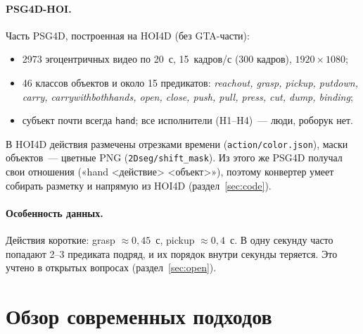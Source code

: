 \documentclass[11pt,a4paper]{article}
\newcommand{\code}[1]{\texttt{#1}}
\begin{document}
\paragraph{PSG4D-HOI.} Часть PSG4D, построенная на HOI4D (без GTA-части):
\begin{itemize}
  \item 2973 эгоцентричных видео по 20~с, 15~кадров/с (300 кадров), $1920\times1080$;
  \item 46 классов объектов и около 15 предикатов: \emph{reachout, grasp, pickup, putdown,
        carry, carrywithbothhands, open, close, push, pull, press, cut, dump, binding};
  \item субъект почти всегда \code{hand}; все исполнители (H1--H4)~--- люди, роборук нет.
\end{itemize}
В HOI4D действия размечены отрезками времени (\code{action/color.json}), маски объектов~---
цветные PNG (\code{2Dseg/shift\_mask}). Из этого же PSG4D получал свои отношения
(«hand \textless действие\textgreater{} \textless объект\textgreater»), поэтому
конвертер умеет собирать разметку и напрямую из HOI4D (раздел~\ref{sec:code}).

\paragraph{Особенность данных.} Действия короткие: grasp $\approx 0{,}45$~с, pickup
$\approx 0{,}4$~с. В одну секунду часто попадают 2--3 предиката подряд, и их порядок внутри
секунды теряется. Это учтено в открытых вопросах (раздел~\ref{sec:open}).

\section{Обзор современных подходов}
\end{document}
